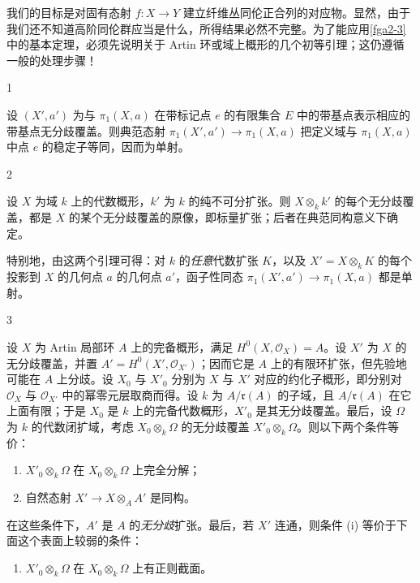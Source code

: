 \par{}我们的目标是对固有态射 \(f\colon  X\to  Y\) 建立纤维丛同伦正合列的对应物。显然，由于我们还不知道高阶同伦群应当是什么，所得结果必然不完整。为了能应用\cref{fga2-3}中的基本定理，必须先说明关于 Artin 环或域上概形的几个初等引理；这仍遵循一般的处理步骤！
\begin{lemma}{1}\label{fga2-lemma-1}\skipsinglepar
\par{}设 \((X',a')\) 为与 \(\pi _1(X,a)\) 在带标记点 \(e\) 的有限集合 \(E\) 中的带基点表示相应的带基点无分歧覆盖。则典范态射 \(\pi _1(X',a')\to \pi _1(X,a)\) 把定义域与 \(\pi _1(X,a)\) 中点 \(e\) 的稳定子等同，因而为单射。\end{lemma}
\begin{lemma}{2}\label{fga2-lemma-2}\skipsinglepar
\par{}设 \(X\) 为域 \(k\) 上的代数概形，\(k'\) 为 \(k\) 的纯不可分扩张。则 \(X\otimes _kk'\) 的每个无分歧覆盖，都是 \(X\) 的某个无分歧覆盖的原像，即标量扩张；后者在典范同构意义下确定。\end{lemma}
\par{}特别地，由这两个引理可得：对 \(k\) 的\emph{任意}代数扩张 \(K\)，以及 \(X'=X\otimes _kK\) 的每个投影到 \(X\) 的几何点 \(a\) 的几何点 \(a'\)，函子性同态 \(\pi _1(X',a')\to \pi _1(X,a)\) 都是单射。
\begin{lemma}{3}\label{fga2-lemma-3}\skipsinglepar
\par{}设 \(X\) 为 Artin 局部环 \(A\) 上的完备概形，满足 \(H^0(X,\mathcal {O}_X)=A\)。设 \(X'\) 为 \(X\) 的无分歧覆盖，并置 \(A'=H^0(X',\mathcal {O}_{X'})\)；因而它是 \(A\) 上的有限环扩张，但先验地可能在 \(A\) 上分歧。设 \(X_0\) 与 \(X'_0\) 分别为 \(X\) 与 \(X'\) 对应的约化子概形，即分别对 \(\mathcal {O}_X\) 与 \(\mathcal {O}_{X'}\) 中的幂零元层取商而得。设 \(k\) 为 \(A/\mathfrak {r}(A)\) 的子域，且 \(A/\mathfrak {r}(A)\) 在它上面有限；于是 \(X_0\) 是 \(k\) 上的完备代数概形，\(X'_0\) 是其无分歧覆盖。最后，设 \(\Omega \) 为 \(k\) 的代数闭扩域，考虑 \(X_0\otimes _k\Omega \) 的无分歧覆盖 \(X'_0\otimes _k\Omega \)。则以下两个条件等价：
\begin{enumerate}
      
 \item[i.]\(X'_0\otimes _k\Omega \) 在 \(X_0\otimes _k\Omega \) 上完全分解；

      
 \item[ii.]自然态射 \(X'\to  X\otimes _AA'\) 是同构。

    \end{enumerate} 在这些条件下，\(A'\) 是 \(A\) 的\emph{无分歧}扩张。最后，若 \(X'\) 连通，则条件 (i) 等价于下面这个表面上较弱的条件：
\begin{enumerate}
      
 \item[i bis.]\(X'_0\otimes _k\Omega \) 在 \(X_0\otimes _k\Omega \) 上有正则截面。

    \end{enumerate}\end{lemma}

